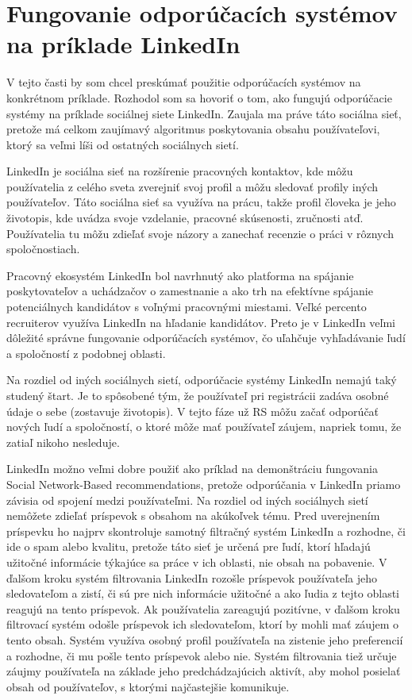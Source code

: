 \documentclass[10pt,twoside,slovak,a4paper]{article}
\begin{document}
\section{Fungovanie odporúčacích systémov na príklade LinkedIn}\label{part4}

V tejto časti by som chcel preskúmať použitie odporúčacích systémov na konkrétnom príklade. Rozhodol som sa hovoriť o tom, ako fungujú odporúčacie systémy na príklade sociálnej siete LinkedIn. Zaujala ma práve táto sociálna sieť, pretože má celkom zaujímavý algoritmus poskytovania obsahu používateľovi, ktorý sa veľmi líši od ostatných sociálnych sietí.



LinkedIn je sociálna sieť na rozšírenie pracovných kontaktov, kde môžu používatelia z celého sveta zverejniť svoj profil a môžu sledovať profily iných používateľov. Táto sociálna sieť sa využíva na prácu, takže profil človeka je jeho životopis, kde uvádza svoje vzdelanie, pracovné skúsenosti, zručnosti atď. Používatelia tu môžu zdieľať svoje názory a zanechať recenzie o práci v rôznych spoločnostiach.


Pracovný ekosystém LinkedIn bol navrhnutý ako platforma na spájanie poskytovateľov a uchádzačov o zamestnanie a ako trh na efektívne spájanie potenciálnych kandidátov s voľnými pracovnými miestami\cite{linkedin_recruit13}. Veľké percento recruiterov využíva LinkedIn na hľadanie kandidátov\cite{linkedin11}. Preto je v LinkedIn veľmi dôležité správne fungovanie odporúčacích systémov, čo uľahčuje vyhľadávanie ľudí a spoločností z podobnej oblasti.


Na rozdiel od iných sociálnych sietí, odporúčacie systémy LinkedIn nemajú taký studený štart. Je to spôsobené tým, že používateľ pri registrácii zadáva osobné údaje o sebe (zostavuje životopis). V tejto fáze už RS môžu začať odporúčať nových ľudí a spoločností, o ktoré môže mať používateľ záujem, napriek tomu, že zatiaľ nikoho nesleduje.


LinkedIn možno veľmi dobre použiť ako príklad na demonštráciu fungovania Social Network-Based recommendations, pretože odporúčania v LinkedIn priamo závisia od spojení medzi používateľmi. Na rozdiel od iných sociálnych sietí nemôžete zdieľať príspevok s obsahom na akúkoľvek tému. Pred uverejnením príspevku ho najprv skontroluje samotný filtračný systém LinkedIn a rozhodne, či ide o spam alebo kvalitu, pretože táto sieť je určená pre ľudí, ktorí hľadajú užitočné informácie týkajúce sa práce v ich oblasti, nie obsah na pobavenie. V ďalšom kroku systém filtrovania LinkedIn rozošle príspevok používateľa jeho sledovateľom a zistí, či sú pre nich informácie užitočné a ako ľudia z tejto oblasti reagujú na tento príspevok. Ak používatelia zareagujú pozitívne, v ďalšom kroku filtrovací systém odošle príspevok ich sledovateľom, ktorí by mohli mať záujem o tento obsah. Systém využíva osobný profil používateľa na zistenie jeho preferencií a rozhodne, či mu pošle tento príspevok alebo nie. Systém filtrovania tiež určuje záujmy používateľa na základe jeho predchádzajúcich aktivít, aby mohol posielať obsah od používateľov, s ktorými najčastejšie komunikuje.
\end{document}
